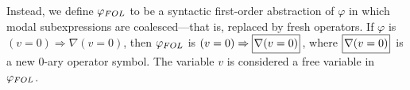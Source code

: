 \documentclass{easychair}
\makeatletter
\renewcommand{\implies}{\Rightarrow}
\newcommand{\FOL}[1]{\ensuremath{#1_{\textit{\scriptsize FOL}}}}
\newcommand{\modal}{\nabla}
\newcommand{\B}[1]{\framebox{\rule{0pt}{.6em}\ensuremath{\!\tlachars #1\!}}\,}
\newcommand{\edmargin}[2]{\marginpar{\raggedright\footnotesize\color{red}#1: #2}}
\newcommand{\edmargin}[2]{}
\def\llnote{\ednote{LL}}
\def\smmargin{\edmargin{SM}}
\let\tlachars\relax
\def\A{\forall\,}
\newenvironment{noj}{\begin{array}[t]{@{}l@{}}}{\end{array}}
\makeatother
\begin{document}

Instead, we define $\FOL{\varphi}$ to be a syntactic first-order
abstraction of $\varphi$ in which modal subexpressions are
coalesced---that is, replaced by fresh operators.
If $\varphi$ is %
$(v=0) \implies \modal(v=0)$, then $\FOL{\varphi}$ is %
$(v = 0) \implies \B{\modal(v=0)}$,
where $\B{\modal(v=0)}$ is a new $0$-ary operator symbol.
The variable $v$ is considered a free variable in $\FOL{\varphi}$.
\end{document}
